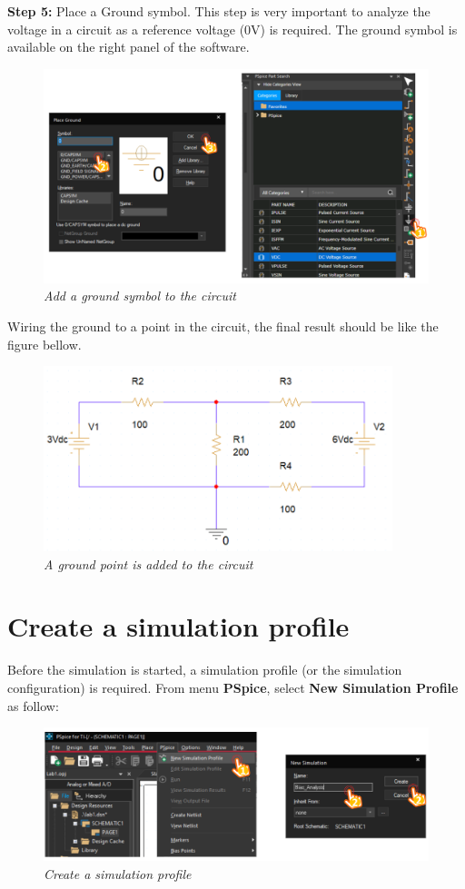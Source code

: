 \textbf{Step 5: } Place a Ground symbol. This step is very important to analyze the voltage in a circuit as a reference voltage (0V) is required. The ground symbol is available on the right panel of the software.
\begin{figure}[!htp]
    \centering
    \includegraphics[width=5in]{source/picture/bai_1/pic11.PNG}
    \caption{\textit{Add a ground symbol to the circuit}}
    \label{bai1_pic11}
\end{figure}

Wiring the ground to a point in the circuit, the final result should be like the figure bellow.

\begin{figure}[!htp]
    \centering
    \includegraphics[width=4in]{source/picture/bai_1/pic13.PNG}
    \caption{\textit{A ground point is added to the circuit}}
    \label{bai1_pic13}
\end{figure}

\section{Create a simulation profile}
Before the simulation is started, a simulation profile (or the simulation configuration) is required. From menu \textbf{PSpice}, select \textbf{New Simulation Profile} as follow:
\begin{figure}[!htp]
    \centering
    \includegraphics[width=5.5in]{source/picture/bai_1/pic14.PNG}
    \caption{\textit{Create a simulation profile}}
    \label{bai1_pic14}
\end{figure}

